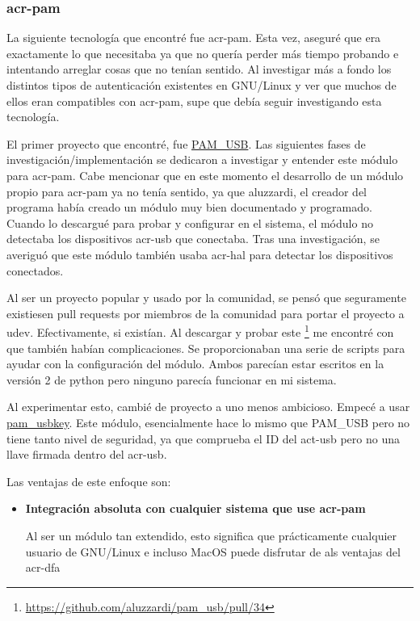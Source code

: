 \documentclass[titlepage, 12pt, a4paper]{article}
\begin{document}
{\subsubsection{\gls{acr-pam}}
La siguiente tecnología que encontré fue \gls{acr-pam}. Esta vez, aseguré que era exactamente lo que necesitaba ya que no quería perder más tiempo probando e intentando arreglar cosas que no tenían sentido. Al investigar más a fondo los distintos tipos de autenticación existentes en \gls{GNU/Linux} y ver que muchos de ellos eran compatibles con \gls{acr-pam}, supe que debía seguir investigando esta tecnología. \par
El primer proyecto que encontré, fue \href{https://github.com/aluzzardi/pam_usb}{PAM\_USB}. Las siguientes fases de investigación/implementación se dedicaron a investigar y entender este módulo para \gls{acr-pam}. Cabe mencionar que en este momento el desarrollo de un módulo propio para \gls{acr-pam} ya no tenía sentido, ya que aluzzardi, el creador del programa había creado un módulo muy bien documentado y programado. Cuando lo descargué para probar y configurar en el sistema, el módulo no detectaba los dispositivos \gls{acr-usb} que conectaba. Tras una investigación, se averiguó que este módulo también usaba \gls{acr-hal} para detectar los dispositivos conectados.\par
Al ser un proyecto popular y usado por la comunidad, se pensó que seguramente existiesen pull requests por miembros de la comunidad para portar el proyecto a \gls{udev}. Efectivamente, si existían. Al descargar y probar este \footnote{\url{https://github.com/aluzzardi/pam_usb/pull/34}} me encontré con que también habían complicaciones. Se proporcionaban una serie de scripts para ayudar con la configuración del módulo. Ambos parecían estar escritos en la versión 2 de python pero ninguno parecía funcionar en mi sistema.\par Al experimentar esto, cambié de proyecto a uno menos ambicioso. Empecé a usar \href{https://github.com/ColumPaget/pam_usbkey}{pam\_usbkey}. Este módulo, esencialmente hace lo mismo que PAM\_USB pero no tiene tanto nivel de seguridad, ya que comprueba el ID del \gls{act-usb} pero no una llave firmada dentro del \gls{acr-usb}. \par
Las ventajas de este enfoque son:
\begin{itemize}
	\item{\textbf{Integración absoluta con cualquier sistema que use \gls{acr-pam}}}\par
		Al ser un módulo tan extendido, esto significa que prácticamente cualquier usuario de \gls{GNU/Linux} e incluso MacOS puede disfrutar de als ventajas del \gls{acr-dfa}

\end{itemize}}
\end{document}
